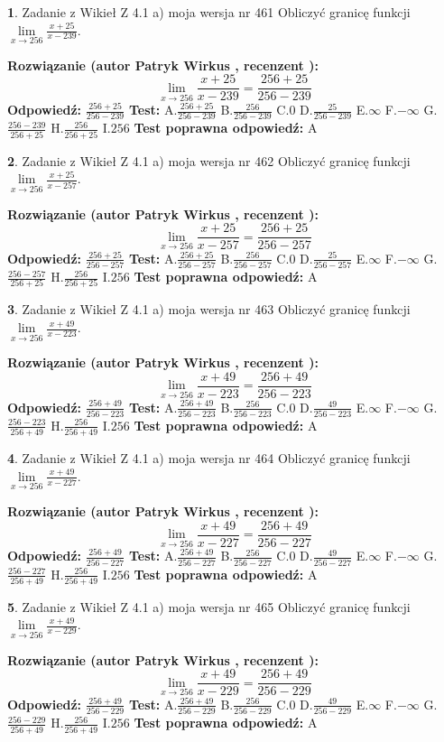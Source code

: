 \documentclass[12pt, a4paper]{article}
\theoremstyle{definition} %
\newtheorem{zad}{}
\newcommand{\zadStart}[1]{\begin{zad}#1\newline}
\newcommand{\zadStop}{\end{zad}}
\newcommand{\rozwStart}[2]{\noindent \textbf{Rozwiązanie (autor #1 , recenzent #2): }\newline}
\newcommand{\rozwStop}{\newline}
\newcommand{\odpStart}{\noindent \textbf{Odpowiedź:}\newline}
\newcommand{\odpStop}{\newline}
\newcommand{\testStart}{\noindent \textbf{Test:}\newline}
\newcommand{\testStop}{\newline}
\newcommand{\kluczStart}{\noindent \textbf{Test poprawna odpowiedź:}\newline}
\newcommand{\kluczStop}{\newline}
\begin{document}
\zadStart{Zadanie z Wikieł Z 4.1 a) moja wersja nr 461}
Obliczyć granicę funkcji $\lim\limits_{x\to256}\frac{x+25}{x-239}$.
\zadStop
\rozwStart{Patryk Wirkus}{}
$$\lim\limits_{x\to256}\frac{x+25}{x-239} = \frac{256+25}{256-239}$$
\rozwStop
\odpStart
$\frac{256+25}{256-239}$
\odpStop
\testStart
A.$\frac{256+25}{256-239}$
B.$\frac{256}{256-239}$
C.$0$
D.$\frac{25}{256-239}$
E.$\infty$
F.$-\infty$
G.$\frac{256-239}{256+25}$
H.$\frac{256}{256+25}$
I.$256$
\testStop
\kluczStart
A
\kluczStop



\zadStart{Zadanie z Wikieł Z 4.1 a) moja wersja nr 462}
Obliczyć granicę funkcji $\lim\limits_{x\to256}\frac{x+25}{x-257}$.
\zadStop
\rozwStart{Patryk Wirkus}{}
$$\lim\limits_{x\to256}\frac{x+25}{x-257} = \frac{256+25}{256-257}$$
\rozwStop
\odpStart
$\frac{256+25}{256-257}$
\odpStop
\testStart
A.$\frac{256+25}{256-257}$
B.$\frac{256}{256-257}$
C.$0$
D.$\frac{25}{256-257}$
E.$\infty$
F.$-\infty$
G.$\frac{256-257}{256+25}$
H.$\frac{256}{256+25}$
I.$256$
\testStop
\kluczStart
A
\kluczStop



\zadStart{Zadanie z Wikieł Z 4.1 a) moja wersja nr 463}
Obliczyć granicę funkcji $\lim\limits_{x\to256}\frac{x+49}{x-223}$.
\zadStop
\rozwStart{Patryk Wirkus}{}
$$\lim\limits_{x\to256}\frac{x+49}{x-223} = \frac{256+49}{256-223}$$
\rozwStop
\odpStart
$\frac{256+49}{256-223}$
\odpStop
\testStart
A.$\frac{256+49}{256-223}$
B.$\frac{256}{256-223}$
C.$0$
D.$\frac{49}{256-223}$
E.$\infty$
F.$-\infty$
G.$\frac{256-223}{256+49}$
H.$\frac{256}{256+49}$
I.$256$
\testStop
\kluczStart
A
\kluczStop



\zadStart{Zadanie z Wikieł Z 4.1 a) moja wersja nr 464}
Obliczyć granicę funkcji $\lim\limits_{x\to256}\frac{x+49}{x-227}$.
\zadStop
\rozwStart{Patryk Wirkus}{}
$$\lim\limits_{x\to256}\frac{x+49}{x-227} = \frac{256+49}{256-227}$$
\rozwStop
\odpStart
$\frac{256+49}{256-227}$
\odpStop
\testStart
A.$\frac{256+49}{256-227}$
B.$\frac{256}{256-227}$
C.$0$
D.$\frac{49}{256-227}$
E.$\infty$
F.$-\infty$
G.$\frac{256-227}{256+49}$
H.$\frac{256}{256+49}$
I.$256$
\testStop
\kluczStart
A
\kluczStop



\zadStart{Zadanie z Wikieł Z 4.1 a) moja wersja nr 465}
Obliczyć granicę funkcji $\lim\limits_{x\to256}\frac{x+49}{x-229}$.
\zadStop
\rozwStart{Patryk Wirkus}{}
$$\lim\limits_{x\to256}\frac{x+49}{x-229} = \frac{256+49}{256-229}$$
\rozwStop
\odpStart
$\frac{256+49}{256-229}$
\odpStop
\testStart
A.$\frac{256+49}{256-229}$
B.$\frac{256}{256-229}$
C.$0$
D.$\frac{49}{256-229}$
E.$\infty$
F.$-\infty$
G.$\frac{256-229}{256+49}$
H.$\frac{256}{256+49}$
I.$256$
\testStop
\kluczStart
A
\kluczStop
\end{document}
